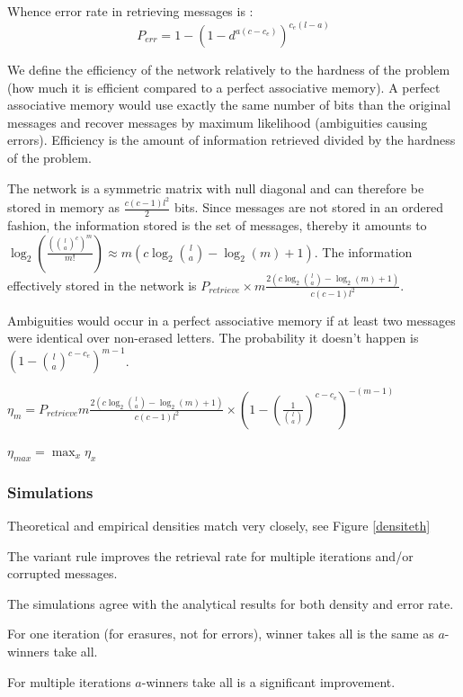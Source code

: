 \documentclass[english,11pt,twocolumn]{article}
\theoremstyle{definition}
\begin{document}
	Whence error rate in retrieving messages is : \[P_{err} = 1 -	\left(1 - d^	{a(c-c_e)}\right)^{c_e(l-a)} \]
	
	We define the efficiency of the network relatively to the hardness of the problem (how much it is efficient compared to a perfect associative memory). A perfect associative memory would use exactly the same number of bits than the original messages and recover messages by maximum likelihood (ambiguities causing errors). Efficiency is the amount of information retrieved divided by the hardness of the problem.
	
	The network is a symmetric matrix with null diagonal and can therefore be stored in memory as $\frac{c(c-1) l^2}{2}$ bits. Since messages are not stored in an ordered fashion, the information stored is the set of messages, thereby it amounts to $\log_2(\frac{({l \choose a}^c)^m}{m!}) \approx m(c \log_2{l \choose a } - \log_2(m) + 1) $. The information effectively stored in the network is $P_{retrieve} \times m  \frac{2 \left(c \log_2{l \choose a } - \log_2(m) + 1 \right)}{c(c-1)l^2}$.
	
	Ambiguities would occur in a perfect associative memory if at least two messages were identical over non-erased letters. The probability it doesn't happen is $ (1-{l \choose a}^{c - c_e})^{m-1}$.
	
	
	$\eta_m = P_{retrieve} m  \frac{2 \left(c \log_2{l \choose a } - \log_2(m) + 1 \right)}{c(c-1)l^2} \times (1-(\frac{1}{{l \choose a}})^{c - c_e})^{-(m-1)}$
	
	$\eta_{max} = \max_x \eta_x $
	
	\subsubsection{Simulations}
		Theoretical and empirical densities match very closely, see Figure \ref{densiteth} %
		
		The variant rule improves the retrieval rate for multiple iterations and/or corrupted messages.
		
		The simulations agree with the analytical results for both density and error rate.
	

	For one iteration (for erasures, not for errors), winner takes all is the same as $a$-winners take all.
	
	For multiple iterations $a$-winners take all is a significant improvement.
	
\end{document}
